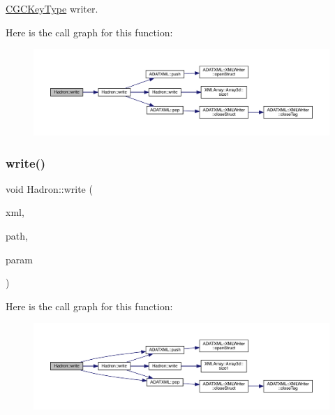 \mbox{\hyperlink{structHadron_1_1CGCKeyType}{C\+G\+C\+Key\+Type}} writer. 

Here is the call graph for this function\+:
\nopagebreak
\begin{figure}[H]
\begin{center}
\leavevmode
\includegraphics[width=350pt]{d1/daf/namespaceHadron_a4073084eccc97c67b860f51e4efd91e0_cgraph}
\end{center}
\end{figure}
\mbox{\label{namespaceHadron_a3ba652c4917e69b9056f2dd7621483df}} 
\subsubsection{\texorpdfstring{write()}{write()}\hspace{0.1cm}{\footnotesize\ttfamily [3/95]}}
{\footnotesize\ttfamily void Hadron\+::write (\begin{DoxyParamCaption}\item[{\mbox{\hyperlink{classADATXML_1_1XMLWriter}{X\+M\+L\+Writer}} \&}]{xml,  }\item[{const std\+::string \&}]{path,  }\item[{const \mbox{\hyperlink{structHadron_1_1HadronNptType__t}{Hadron\+Npt\+Type\+\_\+t}} \&}]{param }\end{DoxyParamCaption})}

Here is the call graph for this function\+:
\nopagebreak
\begin{figure}[H]
\begin{center}
\leavevmode
\includegraphics[width=350pt]{d1/daf/namespaceHadron_a3ba652c4917e69b9056f2dd7621483df_cgraph}
\end{center}
\end{figure}
\mbox{\label{namespaceHadron_a1df6238e1c6eca70a3e05655f2680904}} 
